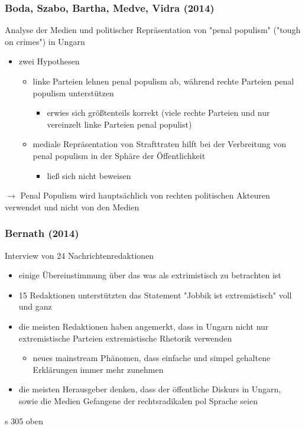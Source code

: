 \documentclass[11pt]{article}
\begin{document}
\subsubsection{Boda, Szabo, Bartha, Medve, Vidra (2014)}
\label{sec:org261e979}
Analyse der Medien und politischer Repräsentation von "penal populism" ("tough on crimes") in Ungarn

\begin{itemize}
\item zwei Hypothesen
\begin{itemize}
\item linke Parteien lehnen penal populism ab, während rechte Parteien penal populism unterstützen
\begin{itemize}
\item erwies sich größtenteils korrekt (viele rechte Parteien und nur vereinzelt linke Parteien penal populist)
\end{itemize}
\item mediale Repräsentation von Strafttraten hilft bei der Verbreitung von penal populism in der Sphäre der Öffentlichkeit
\begin{itemize}
\item ließ sich nicht beweisen
\end{itemize}
\end{itemize}
\end{itemize}

\(\rightarrow\) Penal Populism wird hauptsächlich von rechten politischen Akteuren verwendet und nicht von den Medien

\subsubsection{Bernath (2014)}
\label{sec:org78f02fe}
Interview von 24 Nachrichtenredaktionen
\begin{itemize}
\item einige Übereinstimmung über das was als extrimistisch zu betrachten ist
\item 15 Redaktionen unterstützten das Statement "Jobbik ist extremistisch" voll und ganz
\item die meisten Redaktionen haben angemerkt, dass in Ungarn nicht nur extremistische Parteien extremistische Rhetorik verwenden
\begin{itemize}
\item neues mainstream Phänomen, dass einfache und simpel gehaltene Erklärungen immer mehr zunehmen
\end{itemize}
\item die meisten Herausgeber denken, dass der öffentliche Diskurs in Ungarn, sowie die Medien Gefangene der rechtsradikalen pol Sprache seien
\end{itemize}

s 305 oben
\end{document}
